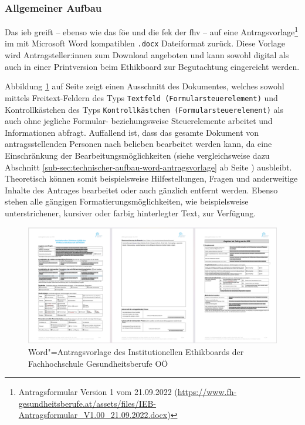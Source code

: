 \documentclass[a4paper,12pt,twoside]{scrreprt}
\begin{document}
\subsubsection*{Allgemeiner Aufbau}
\label{sub-sub-sec:fh-oö-allgemeiner-aufbau}

Das \ac{ieb} greift -- ebenso wie das \ac{föe} und die \ac{fek} der \ac{fhv} -- auf eine Antragsvorlage\footnote{Antragsformular Version 1 vom 21.09.2022 (\url{https://www.fh-gesundheitsberufe.at/assets/files/IEB-Antragsformular_V1.00_21.09.2022.docx})} im mit Microsoft Word kompatiblen \texttt{.docx} Dateiformat zurück. Diese Vorlage wird Antragsteller:innen zum Download angeboten und kann sowohl digital als auch in einer Printversion beim Ethikboard zur Begutachtung eingereicht werden. \cite{fh_gesundheitsberufe_oo_gmbh_einreichung_2023}

\medskip

Abbildung \ref{fig:dokumentenvorlage-ieb} auf Seite \pageref{fig:dokumentenvorlage-ieb} zeigt einen Ausschnitt des Dokumentes, welches sowohl mittels Freitext-Feldern des Typs \texttt{Textfeld (Formularsteuerelement)} und Kontrollkästchen des Typs \texttt{Kontrollkästchen (Formularsteuerelement)} als auch ohne jegliche Formular- beziehungsweise Steuerelemente arbeitet und Informationen abfragt. Auffallend ist, dass das gesamte Dokument von antragsstellenden Personen nach belieben bearbeitet werden kann, da eine Einschränkung der Bearbeitungsmöglichkeiten (siehe vergleichsweise dazu Abschnitt \ref{sub-sec:technischer-aufbau-word-antragsvorlage} ab Seite \pageref{sub-sec:technischer-aufbau-word-antragsvorlage}) ausbleibt. Theoretisch können somit beispielsweise Hilfestellungen, Fragen und anderweitige Inhalte des Antrages bearbeitet oder auch gänzlich entfernt werden. Ebenso stehen alle gängigen Formatierungsmöglichkeiten, wie beispielsweise unterstrichener, kursiver oder farbig hinterlegter Text, zur Verfügung.

\begin{figure}[ht]
    \centering
    \includegraphics[scale=0.21]{thesis/images/Luidold_Word-Vorlage-IEB-FH-Gesundheitsberufe-OOE.png}
    \caption[Word"=Antragsvorlage des Institutionellen Ethikboards der Fachhochschule Gesundheitsberufe OÖ]{Word"=Antragsvorlage des Institutionellen Ethikboards der Fachhochschule Gesundheitsberufe OÖ \cite{fh_gesundheitsberufe_oo_gmbh_dokumente_2023}}
    \label{fig:dokumentenvorlage-ieb}
\end{figure}
\end{document}
